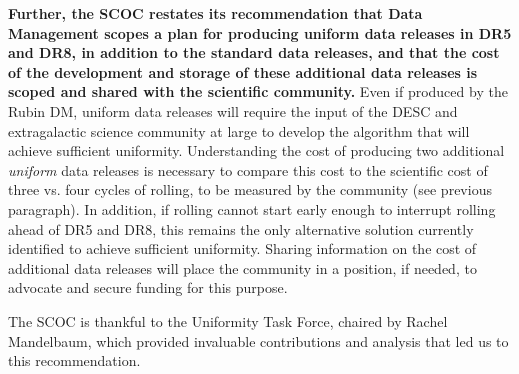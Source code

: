 {\bf Further, the SCOC restates its recommendation that Data Management scopes a plan for producing uniform data releases in DR5 and DR8, in addition to the standard data releases, and that the cost of the development and storage of these additional data releases is scoped and shared with the scientific community.} Even if produced by the Rubin DM, uniform data releases will require the input of the DESC and extragalactic science community at large to develop the algorithm that will achieve sufficient uniformity. Understanding the cost of producing two additional {\it uniform} data releases is necessary to compare this cost to the scientific cost of three vs. four cycles of rolling, to be measured by the community (see previous paragraph). In addition, if rolling cannot start early enough to interrupt rolling ahead of DR5 and DR8, this remains the only alternative solution currently identified to achieve sufficient uniformity. Sharing information on the cost of additional data releases will place the community in a position, if needed, to advocate and secure funding for this purpose.

The SCOC is thankful to the Uniformity Task Force, chaired by Rachel Mandelbaum, which provided invaluable contributions and analysis that led us to this recommendation.


